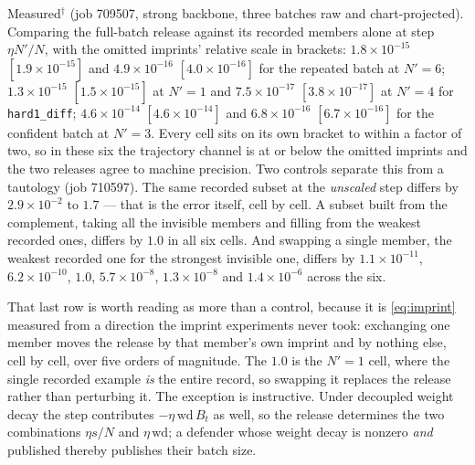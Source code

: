 Measured$^\dagger$ (job 709507, strong backbone, three batches raw and
chart-projected). Comparing the full-batch release against its recorded
members alone at step $\eta N'/N$, with the omitted imprints' relative scale
in brackets: $1.8\times10^{-15}$ $[1.9\times10^{-15}]$ and
$4.9\times10^{-16}$ $[4.0\times10^{-16}]$ for the repeated batch at $N'=6$;
$1.3\times10^{-15}$ $[1.5\times10^{-15}]$ at $N'=1$ and $7.5\times10^{-17}$
$[3.8\times10^{-17}]$ at $N'=4$ for \texttt{hard1\_diff}; $4.6\times10^{-14}$
$[4.6\times10^{-14}]$ and $6.8\times10^{-16}$ $[6.7\times10^{-16}]$ for the
confident batch at $N'=3$. Every cell sits on its own bracket to within a
factor of two, so in these six the trajectory channel is at or below the
omitted imprints and the two releases agree to machine precision. Two
controls separate this from a tautology (job 710597). The same recorded
subset at the \emph{unscaled} step differs by $2.9\times10^{-2}$ to $1.7$ ---
that is the error itself, cell by cell. A subset built from the complement,
taking all the invisible members and filling from the weakest recorded ones,
differs by $1.0$ in all six cells. And swapping a single member, the weakest
recorded one for the strongest invisible one, differs by $1.1\times10^{-11}$,
$6.2\times10^{-10}$, $1.0$, $5.7\times10^{-8}$, $1.3\times10^{-8}$ and
$1.4\times10^{-6}$ across the six.

That last row is worth reading as more than a control, because it is
\eqref{eq:imprint} measured from a direction the imprint experiments never
took: exchanging one member moves the release by that member's own imprint and
by nothing else, cell by cell, over five orders of magnitude. The $1.0$ is the
$N'=1$ cell, where the single recorded example \emph{is} the entire record, so
swapping it replaces the release rather than perturbing it. The exception is
instructive. Under
decoupled weight decay the step contributes $-\eta\,\mathrm{wd}\,B_t$ as well,
so the release determines the two combinations $\eta s/N$ and
$\eta\,\mathrm{wd}$; a defender whose weight decay is nonzero \emph{and}
published thereby publishes their batch size.

